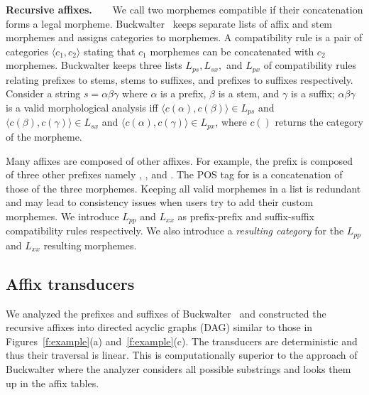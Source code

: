 \documentclass[11pt]{article}
\newcommand{\noTrRL}[1]{\transfalse\RL{#1}\transtrue}
\newcommand{\noTrnoVocRL}[1]{\transfalse\novocalize\noTrRL{#1}\vocalize\transtrue}
\begin{document}
{\bf Recursive affixes.~~~}
We call two morphemes compatible if their concatenation
forms a legal morpheme. 
Buckwalter~ keeps separate lists 
of affix and stem morphemes and assigns categories to
morphemes. 
A compatibility rule is a pair of categories 
$\langle c_1, c_2\rangle$  stating that $c_1$ morphemes
can be concatenated with $c_2$ morphemes.
Buckwalter keeps three lists $L_{ps}, L_{sx},$ and $L_{px}$ 
of compatibility rules relating
prefixes to stems, stems to suffixes, and prefixes to suffixes
respectively. 
Consider a string $s=\alpha\beta\gamma$ where $\alpha$ is 
a prefix, $\beta$ is a stem, and $\gamma$ is a suffix;
$\alpha\beta\gamma$ is a 
valid morphological analysis iff
$\langle c(\alpha),c(\beta)\rangle \in L_{ps}$ and
$\langle c(\beta),c(\gamma)\rangle \in L_{sx}$ and
$\langle c(\alpha),c(\gamma)\rangle \in L_{px}$, where
$c()$ returns the category of the morpheme.

Many affixes are composed of other affixes. For example,
the prefix \noTrnoVocRL{wsy} is composed of three other prefixes
namely \noTrnoVocRL{w}, \noTrnoVocRL{s}, and \noTrnoVocRL{y}.
The POS tag for \noTrnoVocRL{wsy} is a concatenation
of those of the three morphemes. 
Keeping all valid morphemes in a list
is redundant and may lead to consistency issues when
users try to add their custom morphemes.
We introduce $L_{pp}$ and
$L_{xx}$ as prefix-prefix and suffix-suffix 
compatibility rules respectively.
We also introduce a {\em resulting category}
for the $L_{pp}$ and  $L_{xx}$ resulting morphemes.


\subsection{Affix transducers}
\label{sec:affixFSA}

We analyzed the prefixes and suffixes of 
Buckwalter~
and constructed the recursive affixes
into directed acyclic graphs (DAG) similar to 
those in Figures~\ref{f:example}(a) and~\ref{f:example}(c).
The transducers are deterministic and thus 
their traversal is linear.
This is computationally superior to the 
approach of Buckwalter where the analyzer considers
all possible substrings %
and looks them up in the affix tables. 
\end{document}
